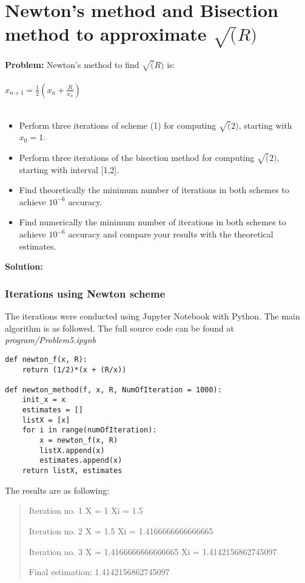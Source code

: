 \newpage

\section{Newton's method and Bisection method to approximate $\sqrt(R)$ }%
\label{sec:newton_s_method_to_find_sqrt_r_}

\textbf{Problem:}
Newton's method to find $\sqrt(R)$ is:\\
\\
$x_{n+1} = \frac{1}{2} (x_n + \frac{R}{x_n})$ \\
\\
\begin{itemize}
    \item Perform three iterations of scheme (1) for computing $\sqrt(2)$, starting with $x_0 = 1$.
    \item Perform three iterations of the bisection method for computing $\sqrt(2)$, starting with interval [1,2].
    \item Find theoretically the minimum number of iterations in both schemes to achieve $10^{-6}$ accuracy.
    \item Find numerically the minimum number of iterations in both schemes to achieve $10^{-6}$ accuracy and compare your results with the theoretical estimates.
\end{itemize}

\textbf{Solution:}
\subsubsection{Iterations using Newton scheme}
The iterations were conducted using Jupyter Notebook with Python. The main algorithm is as followed. The full source code can be found at \textit{program/Problem5.ipynb}
\begin{lstlisting}
def newton_f(x, R):
    return (1/2)*(x + (R/x))

def newton_method(f, x, R, NumOfIteration = 1000):
    init_x = x
    estimates = []
    listX = [x]
    for i in range(numOfIteration):
        x = newton_f(x, R)
        listX.append(x)
        estimates.append(x)
    return listX, estimates
\end{lstlisting}

The results are as following:
\begin{quote}
Iteration no. 1
X =  1
Xi =  1.5

Iteration no. 2
X =  1.5
Xi =  1.4166666666666665

Iteration no. 3
X =  1.4166666666666665
Xi =  1.4142156862745097

Final estimation:  1.4142156862745097
\end{quote}

